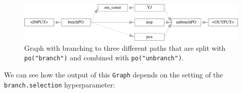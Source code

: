 \begin{Shaded}
\begin{Highlighting}[]
\OtherTok{=} \NormalTok{(}\NormalTok{, }\NormalTok{, }\NormalTok{)}

\OtherTok{=} \NormalTok{(} \NormalTok{) }\SpecialCharTok{\%\textgreater{}\textgreater{}\%}
  \NormalTok{(}\NormalTok{(}
    \NormalTok{(}\NormalTok{),}
    \NormalTok{(}\NormalTok{),}
    \NormalTok{(}\NormalTok{, } \NormalTok{) }\SpecialCharTok{\%\textgreater{}\textgreater{}\%}
      \NormalTok{(}\NormalTok{, } \NormalTok{)}
\NormalTok{  )) }\SpecialCharTok{\%\textgreater{}\textgreater{}\%} \NormalTok{(} \NormalTok{)}

\SpecialCharTok{$}\NormalTok{(} \NormalTok{)}
\end{Highlighting}
\end{Shaded}

\begin{figure}

{\centering \includegraphics[width=1\textwidth,height=\textheight]{chapters/chapter8/non-sequential_pipelines_and_tuning_files/figure-pdf/fig-pipelines-branchone-1.png}

}

\caption{\label{fig-pipelines-branchone}Graph with branching to three
different paths that are split with \texttt{po("branch")} and combined
with \texttt{po("unbranch")}.}

\end{figure}

We can see how the output of this \texttt{Graph} depends on the setting
of the \texttt{branch.selection} hyperparameter:

